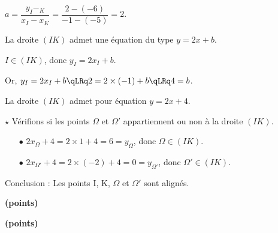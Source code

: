 \documentclass[12pt,french]{article}
\begin{document}
\begin{spacing}{1.2}
\begin{enumerate}[label=\arabic*.]
\begin{enumerate}[label=\alph*)]
	$a=\dfrac{y_I-_K}{x_I-x_K}=\dfrac{2-(-6)}{-1-(-5)}=2$.
	
	La droite $(IK)$ admet une équation du type $y=2x+b$.
	
	$I\in (IK)$, donc $y_I=2x_I+b$.
	
	Or, $y_I=2x_I+b\qLRq 2=2\times (-1)+b\qLRq 4=b$.
	
	La droite $(IK)$ admet pour équation $y=2x+4$.
	
	$\star$ Vérifions si les points $\Omega$ et $\Omega '$ appartiennent ou non à la droite $(IK)$.
	
	\begin{itemize}
	\item[$\bullet$] $2x_{\Omega}+4=2\times 1+4=6=y_{\Omega}$, donc $\Omega\in (IK)$.
	
	\item[$\bullet$] $2x_{\Omega '}+4=2\times (-2)+4=0=y_{\Omega '}$, donc $\Omega '\in (IK)$.
		
	\end{itemize}
	
	Conclusion : Les points I, K, $\Omega$ et $\Omega '$ sont alignés.
	\end{enumerate}
\end{enumerate}
\newpage\exercice \hfill\textbf{(points)}%
\bigskip




\newpage\exercice \hfill\textbf{(points)}%
\bigskip





\end{spacing}
\end{document}

